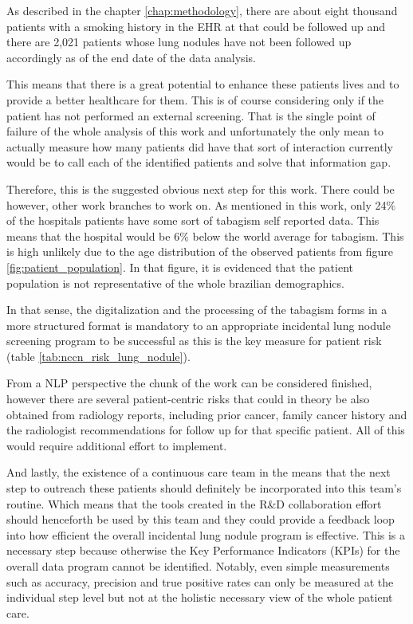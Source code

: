\label{chap:conclusion}

As described in the chapter \ref{chap:methodology}, there are about eight thousand patients with a smoking history in the EHR at \nomeHslShort{} that could be followed up and there are 2,021 patients whose lung nodules have not been followed up accordingly as of the end date of the data analysis.

This means that there is a great potential to enhance these patients lives and to provide a better healthcare for them. This is of course considering only if the patient has not performed an external screening. That is the single point of failure of the whole analysis of this work and unfortunately the only mean to actually measure how many patients did have that sort of interaction currently would be to call each of the identified patients and solve that information gap.

Therefore, this is the suggested obvious next step for this work. There could be however, other work branches to work on. As mentioned in this work, only 24\% of the hospitals patients have some sort of tabagism self reported data. This means that the hospital would be 6\% below the world average for tabagism. This is high unlikely due to the age distribution of the observed patients from figure \ref{fig:patient_population}. In that figure, it is evidenced that the \nomeHslShort{} patient population is not representative of the whole brazilian demographics.%

In that sense, the digitalization and the processing of the tabagism forms in a more structured format is mandatory to an appropriate incidental lung nodule screening program to be successful as this is the key measure for patient risk (table \ref{tab:nccn_risk_lung_nodule}). 

From a NLP perspective the chunk of the work can be considered finished, however there are several patient-centric risks that could in theory be also obtained from radiology reports, including prior cancer, family cancer history and the radiologist recommendations for follow up for that specific patient. All of this would require additional effort to implement.

And lastly, the existence of a continuous care team in the \nomeHsl{} means that the next step to outreach these patients should definitely be incorporated into this team's routine. Which means that the tools created in the R\&D collaboration effort should henceforth be used by this team and they could provide a feedback loop into how efficient the overall incidental lung nodule program is effective. This is a necessary step because otherwise the Key Performance Indicators (KPIs) for the overall data program cannot be identified. Notably, even simple measurements such as accuracy, precision and true positive rates can only be measured at the individual step level but not at the holistic necessary view of the whole patient care.
